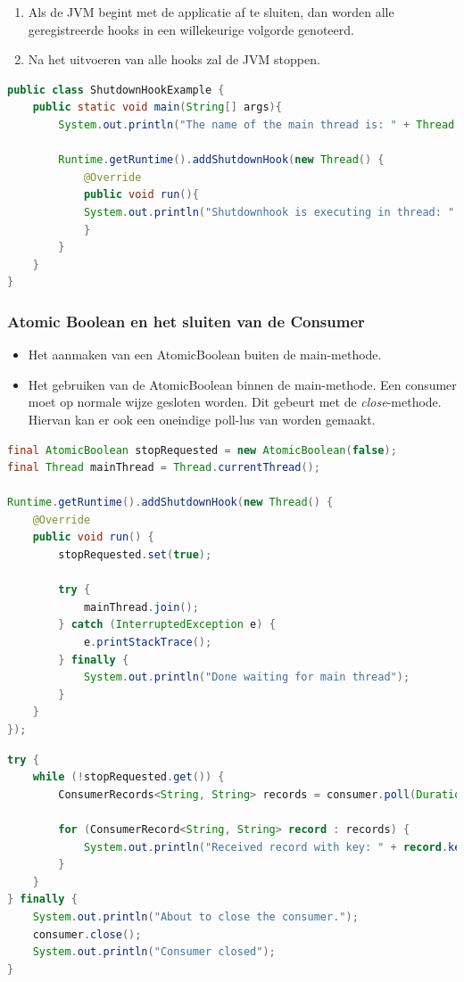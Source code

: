 \documentclass[a4paper,10pt,twoside]{report}
\begin{document}
\begin{enumerate}
	\item Als de JVM begint met de applicatie af te sluiten, dan worden alle geregistreerde hooks in een willekeurige volgorde genoteerd.
	\item Na het uitvoeren van alle hooks zal de JVM 
	stoppen.
\end{enumerate}

\begin{lstlisting}[language=Java]
public class ShutdownHookExample {
	public static void main(String[] args){
		System.out.println("The name of the main thread is: " + Thread.currentThread().getName());
		
		Runtime.getRuntime().addShutdownHook(new Thread() {
			@Override
			public void run(){
			System.out.println("Shutdownhook is executing in thread: " + Thread.currentThread().getName());
			}
		}
	}
}
\end{lstlisting}

\subsubsection{Atomic Boolean en het sluiten van de Consumer}

\begin{itemize}
	\item Het aanmaken van een AtomicBoolean buiten de main-methode.
	\item Het gebruiken van de AtomicBoolean binnen de main-methode. Een consumer moet op normale wijze gesloten worden. Dit gebeurt met de \textit{close}-methode. Hiervan kan er ook een oneindige poll-lus van worden gemaakt.
\end{itemize}

\begin{lstlisting}[language=Java]
final AtomicBoolean stopRequested = new AtomicBoolean(false);
final Thread mainThread = Thread.currentThread();

Runtime.getRuntime().addShutdownHook(new Thread() {
	@Override
	public void run() {
		stopRequested.set(true);
		
		try {
			mainThread.join();
		} catch (InterruptedException e) {
			e.printStackTrace();
		} finally {
			System.out.println("Done waiting for main thread");
		}
	}
});
\end{lstlisting}

\begin{lstlisting}[language=Java]
try {
	while (!stopRequested.get()) {
		ConsumerRecords<String, String> records = consumer.poll(Duration.ofMillis(500));
		
		for (ConsumerRecord<String, String> record : records) {
			System.out.println("Received record with key: " + record.key() + "and value" + record.value());
		}
	}
} finally {
	System.out.println("About to close the consumer.");
	consumer.close();
	System.out.println("Consumer closed");
}
\end{lstlisting}
\end{document}
